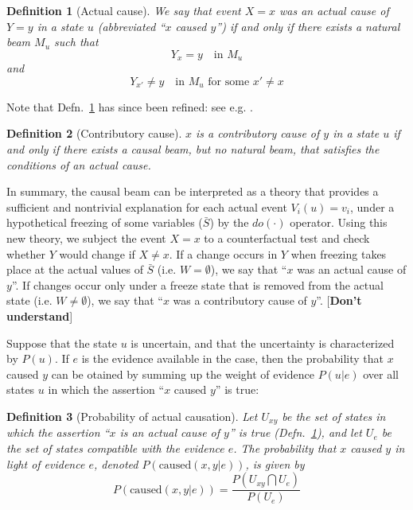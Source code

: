 \documentclass[11pt]{article}
\numberwithin{equation}{section}
\newtheorem{defn}{Definition}[section]
\begin{document}
\begin{defn}[Actual cause] \label{defn:actual-cause}
We say that event $X=x$ was an actual cause of $Y=y$ in a state $u$ (abbreviated ``$x$ caused $y$'') if and only if there exists a natural beam $M_u$ such that
\begin{equation}
Y_x=y \quad \text{in } M_u
\end{equation}
and
\begin{equation}
Y_{x'}\neq y \quad \text{in } M_u \text{ for some } x' \neq x
\end{equation}
\end{defn}
Note that Defn.~\ref{defn:actual-cause} has since been refined: see e.g. \citep{Halpern10, Halpern15}.

\begin{defn}[Contributory cause]
$x$ is a contributory cause of $y$ in a state $u$ if and only if there exists a causal beam, but no natural beam, that satisfies the conditions of an actual cause.
\end{defn}

In summary, the causal beam can be interpreted as a theory that provides a sufficient and nontrivial explanation for each actual event $V_i(u) = v_i$, under a hypothetical freezing of some variables ($\bar{S}$) by the $do(\cdot)$ operator. Using this new theory, we subject the event $X=x$ to a counterfactual test and check whether $Y$ would change if $X \neq x$. If a change occurs in $Y$ when freezing takes place at the actual values of $\bar{S}$ (i.e. $W=\emptyset$), we say that ``$x$ was an actual cause of $y$''. If changes occur only under a freeze state that is removed from the actual state (i.e. $W\neq \emptyset$), we say that ``$x$ was a contributory cause of $y$''. [\textbf{Don't understand}]

Suppose that the state $u$ is uncertain, and that the uncertainty is characterized by $P(u)$. If $e$ is the evidence available in the case, then the probability that $x$ caused $y$ can be otained by summing up the weight of evidence $P(u|e)$ over all states $u$ in which the assertion ``$x$ caused $y$'' is true:
\begin{defn}[Probability of actual causation]
Let $U_{xy}$ be the set of states in which the assertion ``$x$ is an actual cause of $y$'' is true (Defn.~\ref{defn:actual-cause}), and let $U_e$ be the set of states compatible with the evidence $e$. The probability that $x$ caused $y$ in light of evidence $e$, denoted $P(\text{caused}(x, y|e))$, is given by
\begin{equation}
P(\text{caused}(x, y|e)) = \frac{P(U_{xy} \bigcap U_e)}{ P(U_e)}
\end{equation}
\end{defn}
\end{document}
